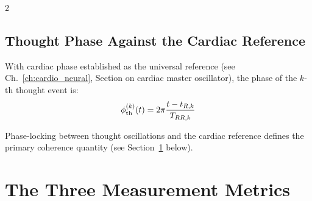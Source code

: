 \begin{multicols}{2}
\subsection{Thought Phase Against the Cardiac Reference}

With cardiac phase established as the universal reference (see Ch.~\ref{ch:cardio_neural}, Section on cardiac master oscillator), the phase of the $k$-th thought event is:
\begin{equation}
\phi_{\mathrm{th}}^{(k)}(t) = 2\pi \frac{t - t_{R,k}}{T_{RR,k}}
\end{equation}

Phase-locking between thought oscillations and the cardiac reference defines the primary coherence quantity (see Section~\ref{sec:ch10_metrics} below).

\end{multicols}

\section{The Three Measurement Metrics}
\label{sec:ch10_metrics}

